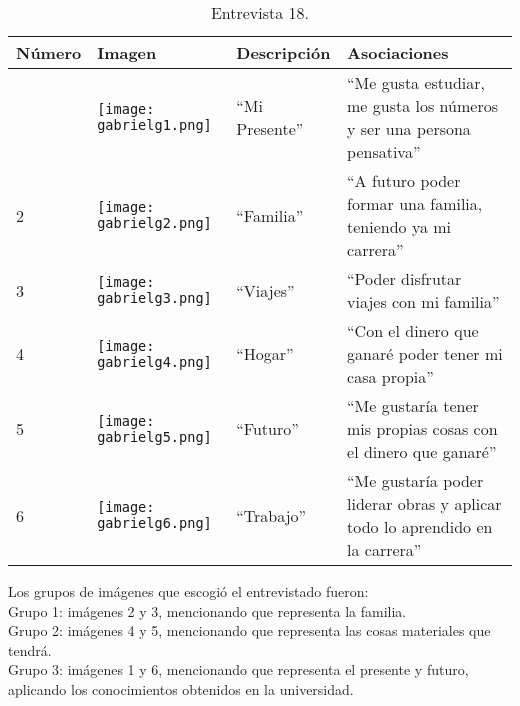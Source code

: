 \begin{table}[H]
	\centering
	\begin{tabular}{>{\centering\arraybackslash}m{1cm} >{\centering\arraybackslash}m{2cm} >{\arraybackslash}m{5cm}>{\arraybackslash}m{5cm}}
		\hline
		Número  & Imagen & Descripción & Asociaciones \\
		\hline \hline
		
		1 & \texttt{[image: gabrielg1.png]} & ``Mi Presente'' & ``Me gusta estudiar, me gusta los números y ser una persona pensativa'' \\
		\hline
		
		2 & \texttt{[image: gabrielg2.png]} & ``Familia'' & ``A futuro poder formar una familia, teniendo ya mi carrera'' \\
		\hline
		
		3 & \texttt{[image: gabrielg3.png]} & ``Viajes'' & ``Poder disfrutar viajes con mi familia'' \\
		\hline
		
		4 & \texttt{[image: gabrielg4.png]} & ``Hogar'' & ``Con el dinero que ganaré poder tener mi casa propia'' \\
		\hline
		
		5 & \texttt{[image: gabrielg5.png]} & ``Futuro'' & ``Me gustaría tener mis propias cosas con el dinero que ganaré'' \\
		\hline
		
		6 & \texttt{[image: gabrielg6.png]} & ``Trabajo'' & ``Me gustaría poder liderar obras y aplicar todo lo aprendido en la carrera'' \\
		\hline
				
	\end{tabular}
	\caption{Entrevista 18.}
	\label{tabla:gabrielg}
\end{table}

Los grupos de imágenes que escogió el entrevistado fueron:\\

Grupo 1: imágenes 2 y 3, mencionando que representa la familia. \\

Grupo 2: imágenes 4 y 5, mencionando que representa las cosas materiales que tendrá.\\

Grupo 3: imágenes 1 y 6, mencionando que representa el presente y futuro, aplicando los conocimientos obtenidos en la universidad.\\


